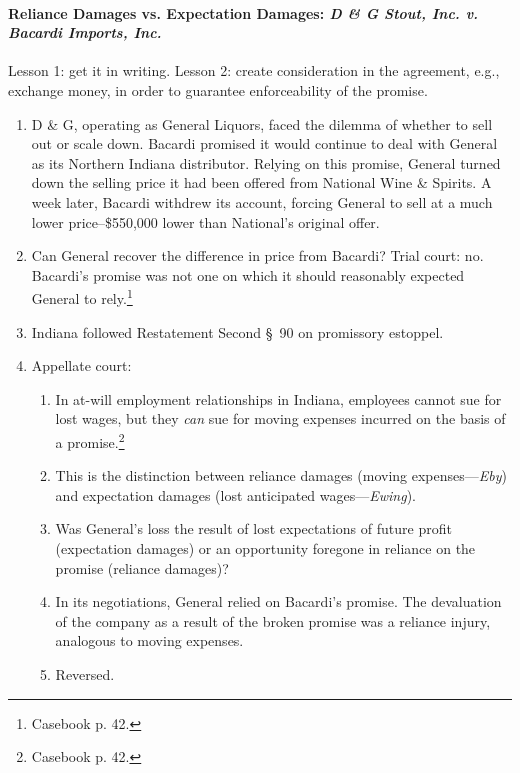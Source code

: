 \paragraph{Reliance Damages vs. Expectation Damages: \emph{D \& G Stout, 
Inc. v. Bacardi Imports, Inc.}}

Lesson 1: get it in writing. Lesson 2: create consideration in the agreement, 
e.g., exchange money, in order to guarantee enforceability of the promise.

\begin{enumerate}
    \item D \& G, operating as General Liquors, faced the dilemma of whether 
    to sell out or scale down. Bacardi promised it would continue to deal with 
    General as its Northern Indiana distributor. Relying on this promise, 
    General turned down the selling price it had been offered from National 
    Wine \& Spirits. A week later, Bacardi withdrew its account, forcing 
    General to sell at a much lower price--\$550,000 lower than National's 
    original offer.
    \item Can General recover the difference in price from Bacardi? Trial 
    court: no. Bacardi's promise was not one on which it should reasonably 
    expected General to rely.\footnote{Casebook p. 42.}
    \item Indiana followed Restatement Second \S\ 90 on promissory estoppel.
    \item Appellate court:
    \begin{enumerate}
        \item In at-will employment relationships in Indiana, employees cannot 
        sue for lost wages, but they \emph{can} sue for moving expenses 
        incurred on the basis of a promise.\footnote{Casebook p. 42.}
        \item This is the distinction between reliance damages (moving 
        expenses---\emph{Eby}) and expectation damages (lost anticipated 
        wages---\emph{Ewing}).
        \item Was General's loss the result of lost expectations of future 
        profit (expectation damages) or an opportunity foregone in reliance on 
        the promise (reliance damages)?
        \item In its negotiations, General relied on Bacardi's promise. The 
        devaluation of the company as a result of the broken promise was a 
        reliance injury, analogous to moving expenses.
        \item Reversed.
    \end{enumerate}
\end{enumerate}

